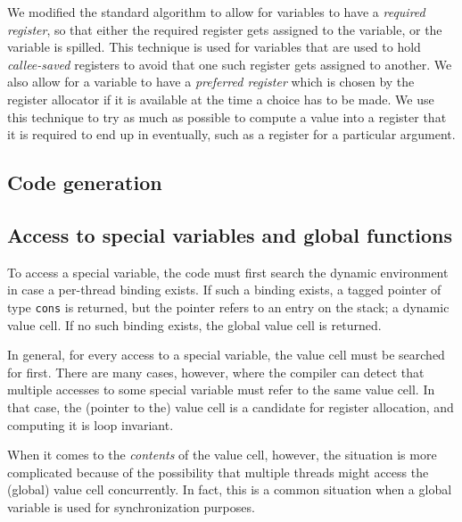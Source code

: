 We modified the standard algorithm to allow for variables to have a
\emph{required register}, so that either the required register gets
assigned to the variable, or the variable is spilled.  This technique
is used for variables that are used to hold \emph{callee-saved}
registers to avoid that one such register gets assigned to another.
We also allow for a variable to have a \emph{preferred register} which
is chosen by the register allocator if it is available at the time a
choice has to be made.  We use this technique to try as much as
possible to compute a value into a register that it is required to end
up in eventually, such as a register for a particular argument.%

\subsection{Code generation} 

\subsection{Access to special variables and global functions}

To access a special variable, the code must first search the dynamic
environment in case a per-thread binding exists.  If such a binding
exists, a tagged pointer of type \texttt{cons} is returned, but the
pointer refers to an entry on the stack; a dynamic value cell.  If no
such binding exists, the global value cell is returned.

In general, for every access to a special variable, the value cell
must be searched for first.  There are many cases, however, where the
compiler can detect that multiple accesses to some special variable
must refer to the same value cell.  In that case, the (pointer to the)
value cell is a candidate for register allocation, and computing it is
loop invariant. 

When it comes to the \emph{contents} of the value cell, however, the
situation is more complicated because of the possibility that multiple
threads might access the (global) value cell concurrently.  In fact,
this is a common situation when a global variable is used for
synchronization purposes.

